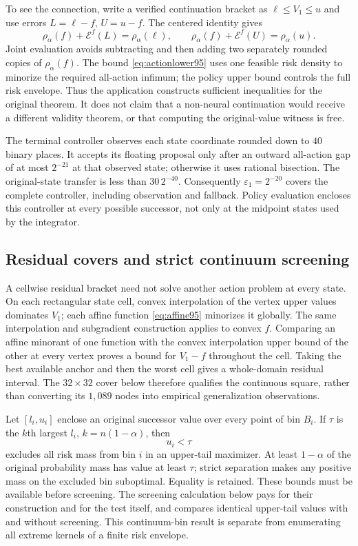 To see the connection, write a verified continuation bracket as $\ell\leq V_1\leq u$ and use errors $L=\ell-f$, $U=u-f$. The centered identity gives
\[
 \rho_\alpha(f)+\mathcal E^f(L)=\rho_\alpha(\ell),\qquad
 \rho_\alpha(f)+\mathcal E^f(U)=\rho_\alpha(u).
\]
Joint evaluation avoids subtracting and then adding two separately rounded copies of $\rho_\alpha(f)$. The bound \eqref{eq:actionlower95} uses one feasible risk density to minorize the required all-action infimum; the policy upper bound controls the full risk envelope. Thus the application constructs sufficient inequalities for the original theorem. It does not claim that a non-neural continuation would receive a different validity theorem, or that computing the original-value witness is free.

The terminal controller observes each state coordinate rounded down to $40$ binary places. It accepts its floating proposal only after an outward all-action gap of at most $2^{-21}$ at that observed state; otherwise it uses rational bisection. The original-state transfer is less than $30\,2^{-40}$. Consequently $\varepsilon_1=2^{-20}$ covers the complete controller, including observation and fallback. Policy evaluation encloses this controller at every possible successor, not only at the midpoint states used by the integrator.

\subsection{Residual covers and strict continuum screening}
A cellwise residual bracket need not solve another action problem at every state. On each rectangular state cell, convex interpolation of the vertex upper values dominates $V_1$; each affine function \eqref{eq:affine95} minorizes it globally. The same interpolation and subgradient construction applies to convex $f$. Comparing an affine minorant of one function with the convex interpolation upper bound of the other at every vertex proves a bound for $V_1-f$ throughout the cell. Taking the best available anchor and then the worst cell gives a whole-domain residual interval. The $32\times32$ cover below therefore qualifies the continuous square, rather than converting its $1,089$ nodes into empirical generalization observations.

Let $[l_i,u_i]$ enclose an original successor value over every point of bin $B_i$. If $\tau$ is the $k$th largest $l_i$, $k=n(1-\alpha)$, then
\begin{equation}\label{eq:strict95}
 u_i<\tau
\end{equation}
excludes all risk mass from bin $i$ in an upper-tail maximizer. At least $1-\alpha$ of the original probability mass has value at least $\tau$; strict separation makes any positive mass on the excluded bin suboptimal. Equality is retained. These bounds must be available before screening. The screening calculation below pays for their construction and for the test itself, and compares identical upper-tail values with and without screening. This continuum-bin result is separate from enumerating all extreme kernels of a finite risk envelope.

